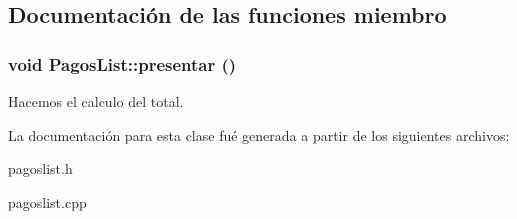 \subsection{Documentaci\'{o}n de las funciones miembro}
\subsubsection{\setlength{\rightskip}{0pt plus 5cm}void Pagos\-List::presentar ()}\label{classPagosList_a10}


Hacemos el calculo del total. 

La documentaci\'{o}n para esta clase fu\'{e} generada a partir de los siguientes archivos:\begin{CompactItemize}
\item 
pagoslist.h\item 
pagoslist.cpp\end{CompactItemize}
